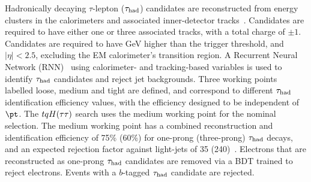 \documentclass[PAPER, coverpage, atlasdraft=true, texlive=2016, UKenglish]{\ATLASLATEXPATH atlasdoc}
\begin{document}
Hadronically decaying $\tau$-lepton ($\tau_{\mathrm{had}}$) candidates are reconstructed from energy clusters in the calorimeters and
associated inner-detector tracks~\cite{ATL-PHYS-PUB-2019-033}. %
Candidates are required to have either one or three associated tracks,
with a total charge of $\pm 1$. Candidates are required to have  GeV higher than the trigger threshold, and $|\eta|<2.5$,
excluding the EM calorimeter's transition region.
A Recurrent Neural Network (RNN)~\cite{Graves:2012SCI}
using calorimeter- and tracking-based variables is used to identify $\tau_{\mathrm{had}}$ candidates and reject jet backgrounds.
Three working points labelled loose, medium and tight are defined, and correspond to different $\tau_{\mathrm{had}}$ identification efficiency values, with the efficiency designed to be independent of $\pt$. The $tqH(\tau\tau)$ search uses the medium
working point for the nominal selection.
The medium working point has a combined reconstruction and identification efficiency of 75\% (60\%) for one-prong (three-prong) $\tau_{\mathrm{had}}$ 
decays, and an expected rejection factor against light-jets of 35 (240)~\cite{ATL-PHYS-PUB-2019-033}. 
Electrons that are reconstructed as one-prong $\tau_{\mathrm{had}}$ candidates are removed via a BDT trained to reject electrons.
Events with a $b$-tagged $\tau_{\mathrm{had}}$ candidate are rejected.
\end{document}
